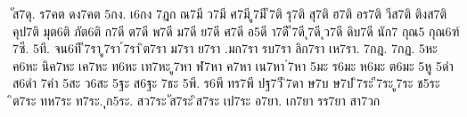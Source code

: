 {ัส7ดุ.
ร7คต
ดง7คต
5กง.
เ6กง
7ฎก
ณ7มี
ว7มี
ศ7มี
ู7มี
ี7ติ
รุ7ติ
สุ7ติ
ฮ7ติ
อร7ติ
วีส7ติ
ติงส7ติ
คุป7ติ
มุต6ติ
ภัต6ติ
ก7ดี
ต7ดี
พ7ดี
ม7ดี
ย7ดี
ศ7ดี
อ5ดี
า7ดี
ี7ดี
ุ7ดี
ุว7ดี
ดิบ7ดี
นัก7
กุณ5
กุณ6ฑ์
7ซี.
5ที.
จน6ที
ี7รา
ู7รา
์7รา
ิต7รา
ม7รา
ย7รา
.มก7รา
รบ7รา
ลิก7รา
เห7รา.
7กฎ.
7กฏ.
5หะ
ค6หะ
นิค7หะ
เค7หะ
ท6หะ
เท7หะ
ู7หา
ฬ7หา
ค7หา
เน7หา
่7หา
5มะ
ร6มะ
ห6มะ
ต6มะ
5หู
5ดำ
ส6ดำ
7คำ
5สะ
ว6สะ
5ฐะ
ส6ฐะ
7ธะ
5พี.
ร6พี
ทร7พี
ปฐ7วี
ิ7ดา
ษ7บ
ษ7ป
ิ7ระ
ี7ระ
ู7ระ
ช5ระ
ิต7ระ
ทห7ระ
ท7ระ.
ุก5ระ.
สว7ระ
ัส7ระ
ิส7ระ
เป7ระ
อ7ยา.
เก7ยา
รร7ยา
สา7วก
}
